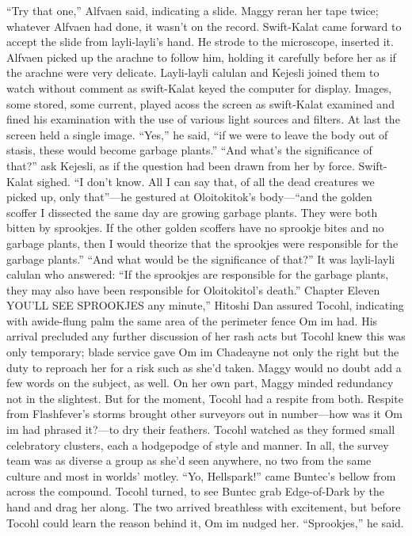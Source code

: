 \documentclass[9pt]{article}
\begin{document}
“Try that one,” Alfvaen said, indicating a slide. Maggy reran her tape twice; whatever Alfvaen had
done, it wasn’t on the record.
Swift-Kalat came forward to accept the slide from layli-layli’s hand. He strode to the microscope,
inserted it. Alfvaen picked up the arachne to follow him, holding it carefully before her as if the arachne
were very delicate.
Layli-layli calulan and Kejesli joined them to watch without comment as swift-Kalat keyed the
computer for display. Images, some stored, some current, played acoss the screen as swift-Kalat
examined and fined his examination with the use of various light sources and filters. At last the screen held
a single image.
“Yes,” he said, “if we were to leave the body out of stasis, these would become garbage plants.”
“And what’s the significance of that?” ask Kejesli, as if the question had been drawn from her by
force.
Swift-Kalat sighed. “I don’t know. All I can say that, of all the dead creatures we picked up, only
that”—he gestured at Oloitokitok’s body—“and the golden scoffer I dissected the same day are growing
garbage plants. They were both bitten by sprookjes. If the other golden scoffers have no sprookje bites
and no garbage plants, then I would theorize that the sprookjes were responsible for the garbage plants.”
“And what would be the significance of that?”
It was layli-layli calulan who answered: “If the sprookjes are responsible for the garbage plants,
they may also have been responsible for Oloitokitol’s death.”
Chapter Eleven
YOU’LL SEE SPROOKJES any minute,” Hitoshi Dan assured Tocohl, indicating with awide-flung palm the same area of the perimeter fence Om im had.
His arrival precluded any further discussion of her rash acts but Tocohl knew this was only
temporary; blade service gave Om im Chadeayne not only the right but the duty to reproach her for a
risk such as she’d taken. Maggy would no doubt add a few words on the subject, as well. On her own
part, Maggy minded redundancy not in the slightest. But for the moment, Tocohl had a respite from both.
Respite from Flashfever’s storms brought other surveyors out in number—how was it Om im had
phrased it?—to dry their feathers. Tocohl watched as they formed small celebratory clusters, each a
hodgepodge of style and manner. In all, the survey team was as diverse a group as she’d seen anywhere,
no two from the same culture and most in worlds’ motley.
“Yo, Hellspark!” came Buntec’s bellow from across the compound. Tocohl turned, to see Buntec
grab Edge-of-Dark by the hand and drag her along. The two arrived breathless with excitement, but
before Tocohl could learn the reason behind it, Om im nudged her. “Sprookjes,” he said.
\end{document}
